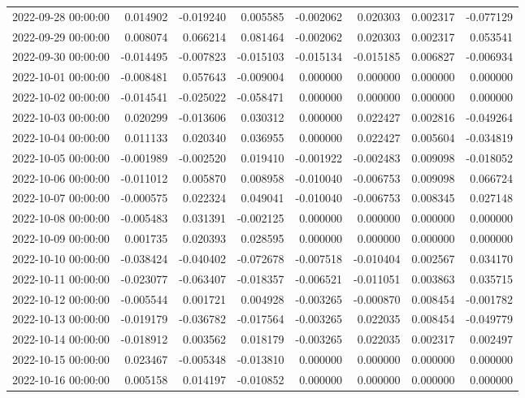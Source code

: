\begin{tabular}{lrrrrrrr}
2022-09-28 00:00:00 & 0.014902 & -0.019240 & 0.005585 & -0.002062 & 0.020303 & 0.002317 & -0.077129 \\
2022-09-29 00:00:00 & 0.008074 & 0.066214 & 0.081464 & -0.002062 & 0.020303 & 0.002317 & 0.053541 \\
2022-09-30 00:00:00 & -0.014495 & -0.007823 & -0.015103 & -0.015134 & -0.015185 & 0.006827 & -0.006934 \\
2022-10-01 00:00:00 & -0.008481 & 0.057643 & -0.009004 & 0.000000 & 0.000000 & 0.000000 & 0.000000 \\
2022-10-02 00:00:00 & -0.014541 & -0.025022 & -0.058471 & 0.000000 & 0.000000 & 0.000000 & 0.000000 \\
2022-10-03 00:00:00 & 0.020299 & -0.013606 & 0.030312 & 0.000000 & 0.022427 & 0.002816 & -0.049264 \\
2022-10-04 00:00:00 & 0.011133 & 0.020340 & 0.036955 & 0.000000 & 0.022427 & 0.005604 & -0.034819 \\
2022-10-05 00:00:00 & -0.001989 & -0.002520 & 0.019410 & -0.001922 & -0.002483 & 0.009098 & -0.018052 \\
2022-10-06 00:00:00 & -0.011012 & 0.005870 & 0.008958 & -0.010040 & -0.006753 & 0.009098 & 0.066724 \\
2022-10-07 00:00:00 & -0.000575 & 0.022324 & 0.049041 & -0.010040 & -0.006753 & 0.008345 & 0.027148 \\
2022-10-08 00:00:00 & -0.005483 & 0.031391 & -0.002125 & 0.000000 & 0.000000 & 0.000000 & 0.000000 \\
2022-10-09 00:00:00 & 0.001735 & 0.020393 & 0.028595 & 0.000000 & 0.000000 & 0.000000 & 0.000000 \\
2022-10-10 00:00:00 & -0.038424 & -0.040402 & -0.072678 & -0.007518 & -0.010404 & 0.002567 & 0.034170 \\
2022-10-11 00:00:00 & -0.023077 & -0.063407 & -0.018357 & -0.006521 & -0.011051 & 0.003863 & 0.035715 \\
2022-10-12 00:00:00 & -0.005544 & 0.001721 & 0.004928 & -0.003265 & -0.000870 & 0.008454 & -0.001782 \\
2022-10-13 00:00:00 & -0.019179 & -0.036782 & -0.017564 & -0.003265 & 0.022035 & 0.008454 & -0.049779 \\
2022-10-14 00:00:00 & -0.018912 & 0.003562 & 0.018179 & -0.003265 & 0.022035 & 0.002317 & 0.002497 \\
2022-10-15 00:00:00 & 0.023467 & -0.005348 & -0.013810 & 0.000000 & 0.000000 & 0.000000 & 0.000000 \\
2022-10-16 00:00:00 & 0.005158 & 0.014197 & -0.010852 & 0.000000 & 0.000000 & 0.000000 & 0.000000 \\

\end{tabular}
